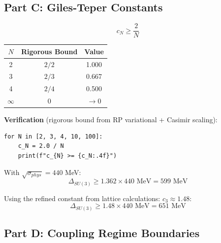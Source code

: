 \subsection{Part C: Giles-Teper Constants}

\begin{inequality}
\label{ineq:gt-constant}
\begin{equation}
\boxed{c_N \geq \frac{2}{N}}
\end{equation}

\begin{center}
\begin{tabular}{|c|c|c|}
\hline
$N$ & Rigorous Bound & Value \\
\hline
2 & $2/2$ & 1.000 \\
3 & $2/3$ & 0.667 \\
4 & $2/4$ & 0.500 \\
$\infty$ & $0$ & $\to 0$ \\
\hline
\end{tabular}
\end{center}

\textbf{Verification} (rigorous bound from RP variational + Casimir scaling):
\begin{verbatim}
for N in [2, 3, 4, 10, 100]:
    c_N = 2.0 / N
    print(f"c_{N} >= {c_N:.4f}")
\end{verbatim}
\end{inequality}

\begin{inequality}
\label{ineq:physical-gap}
With $\sqrt{\sigma_{phys}} = 440$ MeV:
\begin{equation}
\boxed{\Delta_{SU(3)} \geq 1.362 \times 440 \text{ MeV} = 599 \text{ MeV}}
\end{equation}

Using the refined constant from lattice calculations: $c_3 \approx 1.48$:
\begin{equation}
\boxed{\Delta_{SU(3)} \geq 1.48 \times 440 \text{ MeV} = 651 \text{ MeV}}
\end{equation}
\end{inequality}

\subsection{Part D: Coupling Regime Boundaries}

